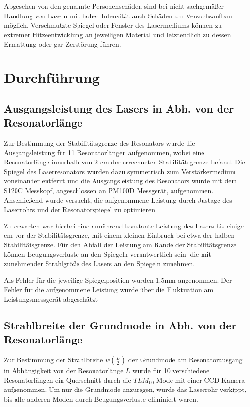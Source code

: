 \documentclass[bigchapter,colorback,accentcolor=tud4b,linedtoc,11pt]{tudreport}
\numberwithin{equation}{subsection}
\begin{document}
Abgesehen von den genannte Personenschäden sind bei nicht sachgemäßer Handlung von Lasern mit hoher Intensität auch Schäden am Versuchsaufbau möglich. Verschmutzte Spiegel oder Fenster des Lasermediums können zu extremer Hitzeentwicklung an jeweiligen Material und letztendlich zu dessen Ermattung oder gar Zerstörung führen.
\chapter{Durchführung}
\section{Ausgangsleistung des Lasers in Abh. von der Resonatorlänge}
Zur Bestimmung der Stabilitätsgrenze des Resonators wurde die Ausgangsleistung für 11 Resonatorlängen aufgenommen, wobei eine Resonatorlänge innerhalb von 2 cm der errechneten Stabilitätsgrenze befand.
Die Spiegel des Laserresonators wurden dazu symmetrisch zum Verstärkermedium voneinander entfernt und die Ausgangsleistung des Resonators wurde mit dem S120C Messkopf, angeschlossen an PM100D Messgerät, aufgenommen. Anschließend wurde versucht, die aufgenommene Leistung durch Justage des Laserrohrs und der Resonatorspiegel zu optimieren.

Zu erwarten war hierbei eine annährend konstante Leistung des Lasers bis einige cm vor der Stabilitätsgrenze, mit einem kleinen Einbruch bei etwa der halben Stabilitätsgrenze.
Für den Abfall der Leistung am Rande der Stabilitätsgrenze können Beugungsverluste an den Spiegeln verantwortlich sein, die mit zunehmender Strahlgröße des Lasers an den Spiegeln zunehmen.

Als Fehler für die jeweilige Spiegelposition wurden 1.5mm angenommen. Der Fehler für die aufgenommene Leistung wurde über die Fluktuation am Leistungsmessgerät abgeschätzt

\FloatBarrier
\section{Strahlbreite der Grundmode in Abh. von der Resonatorlänge}
Zur Bestimmung der Strahlbreite \(w\left(\frac{L}{2}\right)\) der Grundmode am Resonatorausgang in Abhängigkeit von der Resonatorlänge \(L\) wurde für 10 verschiedene Resonatorlängen ein Querschnitt durch die $TEM_{00}$ Mode mit einer CCD-Kamera aufgenommen. Um nur die Grundmode anzuregen, wurde das Laserrohr verkippt, bis alle anderen Moden durch Beugungsverluste eliminiert waren.
\end{document}
